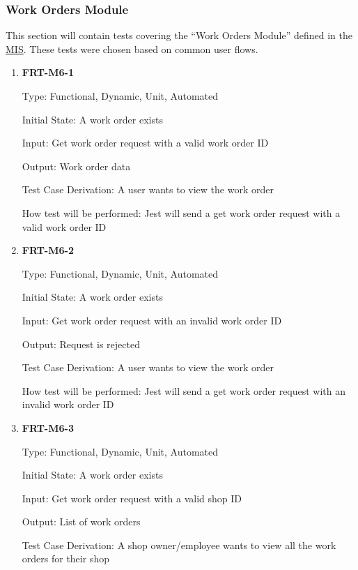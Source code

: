 \documentclass[12pt, titlepage]{article}
\begin{document}
\subsubsection{Work Orders Module}

This section will contain tests covering the ``Work Orders Module'' defined in the
\href{https://github.com/arkinmodi/project-sayyara/blob/main/docs/Design/SoftDetailedDes/MIS.pdf}{MIS}.
These tests were chosen based on common user flows.

\begin{enumerate}

	\item \textbf{FRT-M6-1}

	      Type: Functional, Dynamic, Unit, Automated

	      Initial State: A work order exists

	      Input: Get work order request with a valid work order ID

	      Output: Work order data

	      Test Case Derivation: A user wants to view the work order

	      How test will be performed: Jest will send a get work order request with a valid work order ID

	\item \textbf{FRT-M6-2}

	      Type: Functional, Dynamic, Unit, Automated

	      Initial State: A work order exists

	      Input: Get work order request with an invalid work order ID

	      Output: Request is rejected

	      Test Case Derivation: A user wants to view the work order

	      How test will be performed: Jest will send a get work order request with an invalid work order ID

	\item \textbf{FRT-M6-3}

	      Type: Functional, Dynamic, Unit, Automated

	      Initial State: A work order exists

	      Input: Get work order request with a valid shop ID

	      Output: List of work orders

	      Test Case Derivation: A shop owner/employee wants to view all the work orders for their shop


\end{enumerate}
\end{document}
